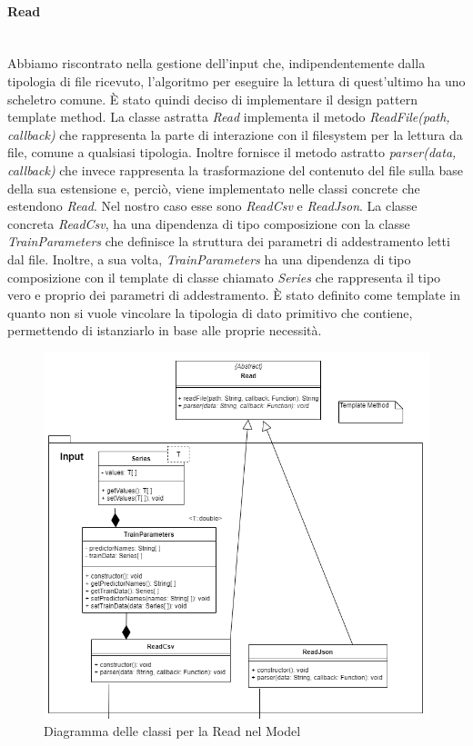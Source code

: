 		\paragraph*{Read} \mbox{} \\[1mm]
		Abbiamo riscontrato nella gestione dell'input che, indipendentemente dalla tipologia di file ricevuto, l'algoritmo per eseguire la lettura di quest'ultimo ha uno scheletro comune. È stato quindi deciso di implementare il design pattern template method.
		La classe astratta \textit{Read} implementa il metodo \textit{ReadFile(path, callback)} che rappresenta la parte di interazione con il filesystem per la lettura da file, comune a qualsiasi tipologia. Inoltre fornisce il metodo astratto \textit{parser(data, callback)} che invece rappresenta la trasformazione del contenuto del file sulla base della sua estensione e, perciò, viene implementato nelle classi concrete che estendono \textit{Read}. Nel nostro caso esse sono \textit{ReadCsv} e \textit{ReadJson}.
		La classe concreta \textit{ReadCsv}, ha una dipendenza di tipo composizione con la classe \textit{TrainParameters} che definisce la struttura dei parametri di addestramento letti dal file. Inoltre, a sua volta, \textit{TrainParameters} ha una dipendenza di tipo composizione con il template di classe chiamato \textit{Series} che rappresenta il tipo vero e proprio dei parametri di addestramento. È stato definito come template in quanto non si vuole vincolare la tipologia di dato primitivo che contiene, permettendo di istanziarlo in base alle proprie necessità.
		\mbox{}
				\begin{figure} [H]
					\includegraphics[width=\linewidth]{img/Diagrammi/read-app.png}
					\caption{Diagramma delle classi per la Read nel Model}
				\end{figure}
